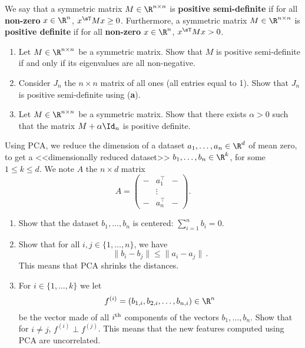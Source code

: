 \documentclass[11pt,nocut]{article}
\begin{document}


\begin{problem}[3 points]
	We say that a symmetric matrix $M \in \R^{n \times n}$ is \textbf{positive semi-definite} if for all \textbf{non-zero} $x \in \R^n$, $
	x^{\sT} M x \geq 0$. Furthermore, a symmetric matrix $M \in \R^{n \times n}$ is \textbf{positive definite} if for all \textbf{non-zero} $x \in \R^n$, $
	x^{\sT} M x > 0$.
	\begin{enumerate}[label=\normalfont(\textbf{\alph*})]
		\item Let $M \in \R^{n \times n}$ be a symmetric matrix. Show that $M$ is positive semi-definite if and only if its eigenvalues are all non-negative.
		\item Consider $J_n$ the $n \times n$ matrix of all ones (all entries equal to 1). Show that $J_n$ is positive semi-definite using \normalfont(\textbf{a}).
		\item Let $M \in \R^{n \times n}$ be a symmetric matrix. Show that there exists $\alpha > 0$ such that the matrix $M + \alpha \Id_n$ is positive definite.
	\end{enumerate}
\end{problem}

\vspace{5mm}

\begin{problem}[3 points]
	Using PCA, we reduce the dimension of a dataset $a_1, \dots, a_n \in \R^d$ of mean zero, to get a <<dimensionally reduced dataset>> $b_1 , \dots, b_n \in \R^k$, for some $1 \leq k \leq d$. We note $A$ the $n \times d$ matrix $$
    A = \begin{pmatrix}
        - & a_1^\top & - \\
        &\vdots& \\
        - & a_n^\top & -
    \end{pmatrix}.$$
	\begin{enumerate}[label=\normalfont(\textbf{\alph*})]
		\item Show that the dataset $b_1, \dots, b_n$ is centered: $\sum_{i = 1}^n b_i = 0$.
		\item Show that for all $i,j \in \{1, \dots, n\}$, we have
			$$
				\|b_i - b_j\| \leq \|a_i - a_j\| \,.
			$$
			This means that PCA shrinks the distances.
		\item For $i \in \{1, \dots, k\}$ we let
			$$
			f^{(i)} = (b_{1,i}, b_{2,i}, \dots, b_{n,i}) \in \R^n
			$$
			be the vector made of all $i^{\rm th}$ components of the vectors $b_1, \dots, b_n$.
			Show that for $i \neq j$, $f^{(i)} \perp f^{(j)}$. This means that the new features computed using PCA are uncorrelated. 
	\end{enumerate}
\end{problem}
\end{document}
